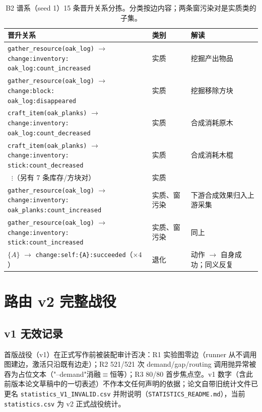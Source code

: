\documentclass[10pt,a4paper]{ctexart}
\begin{document}
\begin{table}[h]
\centering\small
\caption{B2 谱系（seed 1）15 条晋升关系分拣。分类按边内容；两条窗污染对是实质类的子集。}
\label{tab:taxonomy}
\begin{tabular}{L{6.6cm}L{2.2cm}L{5.2cm}}
\toprule
\textbf{晋升关系} & \textbf{类别} & \textbf{解读} \\
\midrule
\texttt{gather\_resource(oak\_log)} $\rightarrow$ \texttt{change:inventory:\newline oak\_log:count\_increased} & 实质 & 挖掘产出物品 \\
\texttt{gather\_resource(oak\_log)} $\rightarrow$ \texttt{change:block:\newline oak\_log:disappeared} & 实质 & 挖掘移除方块 \\
\texttt{craft\_item(oak\_planks)} $\rightarrow$ \texttt{change:inventory:\newline oak\_log:count\_decreased} & 实质 & 合成消耗原木 \\
\texttt{craft\_item(oak\_planks)} $\rightarrow$ \texttt{change:inventory:\newline stick:count\_decreased} & 实质 & 合成消耗木棍 \\
$\;\;\vdots$（另有 7 条库存/方块对） & 实质 & \\
\midrule
\texttt{gather\_resource(oak\_log)} $\rightarrow$ \texttt{change:inventory:\newline oak\_planks:count\_increased} & 实质、窗污染 & 下游合成效果归入上游采集 \\
\texttt{gather\_resource(oak\_log)} $\rightarrow$ \texttt{change:inventory:\newline stick:count\_increased} & 实质、窗污染 & 同上 \\
\midrule
\texttt{$\{A\}$} $\rightarrow$ \texttt{change:self:\{A\}:succeeded}（$\times 4$） & 退化 & 动作 $\rightarrow$ 自身成功；同义反复 \\
\bottomrule
\end{tabular}
\end{table}

\section{路由 v2 完整战役}
\label{app:routing}
\subsection{v1 无效记录}
首版战役（v1）在正式写作前被装配审计否决：R1 实验图零边（runner 从不调用图建边，激活只沿既有边走）；R2 521/521 次 demand/gap/routing 调用抛异常被吞为占位文本（"--demand"消融$\equiv$恒等）；R3 80/80 首步焦点空。v1 数字（含此前版本论文草稿中的一切表述）不作本文任何声明的依据；论文自带旧统计文件已更名 \texttt{statistics\_V1\_INVALID.csv} 并附说明（\texttt{STATISTICS\_README.md}），当前 \texttt{statistics.csv} 为 v2 正式战役统计。
\end{document}
